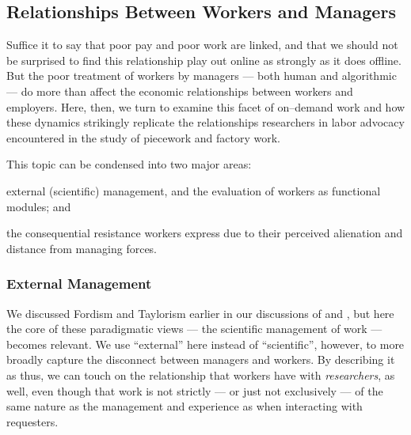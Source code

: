 \documentclass[trackingWork]{subfiles}
\begin{document}
{\begin{appendices}
    \subsection{Relationships Between Workers and Managers}\label{sec:relationships}
    Suffice it to say that poor pay and poor work are linked,
    and that we should not be surprised to find this relationship play out online as strongly as it does offline.
    But the poor treatment of workers by managers
    --- both human and algorithmic ---
    do more than affect the economic relationships between workers and employers.
    Here, then, we turn to examine this facet of on--demand work
    and how these dynamics strikingly replicate the relationships
    researchers in labor advocacy encountered in the study of piecework and factory work.

    This topic can be condensed into two major areas:
    \begin{inlinelist}
    \item external (scientific) management, and the evaluation of workers as functional modules; and
    \item the consequential resistance workers express due to their perceived alienation and distance from managing forces.
    \end{inlinelist}

    \subsubsection{External Management}
    We discussed Fordism and Taylorism earlier in our discussions of
     and ,
    but here the core of these paradigmatic views
    --- the scientific management of work ---
    becomes relevant.
    We use ``external'' here instead of ``scientific'', however,
    to more broadly capture the disconnect between managers and workers.
    By describing it as thus,
    we can touch on the relationship that workers have with \textit{researchers}, as well,
    even though that work is not strictly
    --- or just not exclusively ---
    of the same nature as the management and experience as when interacting with requesters.


\end{appendices}}
\end{document}
